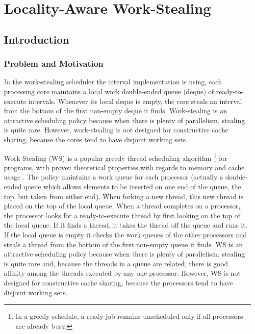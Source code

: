 
\part{Locality-Aware Work-Stealing}
\label{part:locality}

\chapter{Introduction}
\label{chap:locality-introduction}


\section{Problem and Motivation}
\label{sec:locality-intro-problem-and-motivation}


In the work-stealing scheduler the interval implementation is using,
each processing core maintains a local work double-ended queue (deque)
of ready-to-execute intervals. Whenever its local deque is empty, the
core steals an interval from the bottom of the first non-empty deque
it finds. Work-stealing is an attractive scheduling policy because
when there is plenty of parallelism, stealing is quite rare. However,
work-stealing is not designed for constructive cache sharing, because
the cores tend to have disjoint working sets.


Work Stealing (WS) is a popular greedy thread scheduling algorithm
\footnote{In a greedy schedule, a ready job remains unscheduled only
  if all processors are already busy.} for programs, with proven
theoretical properties with regards to memory and cache usage
\cite{Blumofe1998a, Blumofe1999, Acar2002}. The policy maintains a
work queue for each processor (actually a double-ended queue which
allows elements to be inserted on one end of the queue, the top, but
taken from either end). When forking a new thread, this new thread is
placed on the top of the local queue. When a thread completes on a
processor, the processor looks for a ready-to-execute thread by first
looking on the top of the local queue. If it finds a thread, it takes
the thread off the queue and runs it. If the local queue is empty it
checks the work queues of the other processors and steals a thread
from the bottom of the first non-empty queue it finds. WS is an
attractive scheduling policy because when there is plenty of
parallelism, stealing is quite rare and, because the threads in a
queue are related, there is good affinity among the threads executed
by any one processor. However, WS is not designed for constructive
cache sharing, because the processors tend to have disjoint working
sets.

